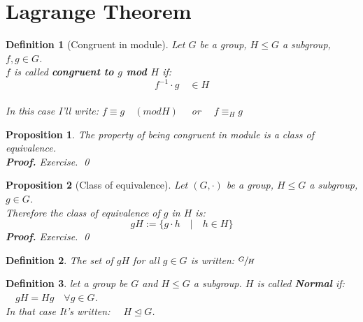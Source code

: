 \documentclass{report}
\newtheorem{prop}{Proposition}
\newtheorem{defi}{Definition}
\renewenvironment{proof}{{\noindent\bfseries Proof. }}{\qed}
\begin{document}
\section{Lagrange Theorem}
    \begin{defi}[Congruent in module]
        Let $G$ be a group, $H\leq G$ a subgroup, $f,g\in G$.\\
        $f$ is called \textbf{congruent to $g$ mod $H$} if: 
        $$f^{-1}\cdot g \quad\in H  $$
        \\In this case I'll write: $f\equiv g \quad (mod H)\quad$ or $\quad f \equiv_{H} g$
    \end{defi}\vspace{.5 cm}
    \begin{prop}
        The property of being congruent in module is a class of equivalence.\\
        \begin{proof}
            Exercise.
        \end{proof}
    \end{prop}\vspace{.5 cm}
    \begin{prop}[Class of equivalence]
        Let $(G,\cdot)$ be a group, $H\le G$ a subgroup, $g \in G$.\\ 
        Therefore the class of equivalence of $g$ in $H$ is:
        $$gH:=\{g\cdot h \quad|\quad h\in H  \}$$
        \begin{proof}
            Exercise.
        \end{proof}
    \end{prop}\vspace{.5 cm}
    \begin{defi}
        The set of $gH$ for all $g \in G$ is written: $\sfrac{G}{H}$
    \end{defi}\vspace{.5 cm}
    \begin{defi}
        let a group be $G$ and $H\leq G$ a subgroup. $H$ is called \textbf{Normal} if: $\quad gH = Hg \quad\forall g \in G$.\\ In that case It's written: $\quad H\unlhd G$. 
    \end{defi}\vspace{.5 cm}
    
\end{document}
